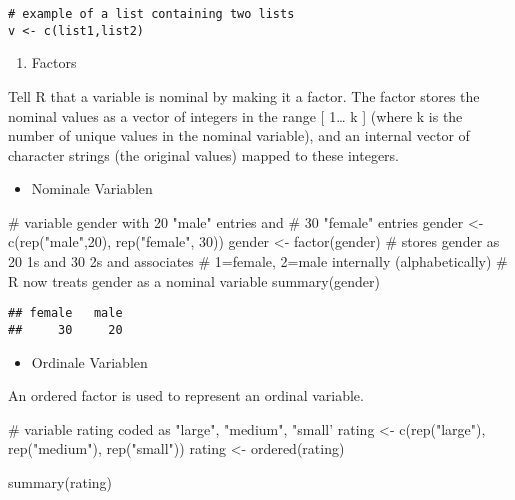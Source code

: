 \documentclass[]{article}
\newenvironment{Shaded}{\begin{snugshade}}{\end{snugshade}}
\newcommand{\KeywordTok}[1]{\textcolor[rgb]{0.94,0.87,0.69}{{#1}}}
\newcommand{\DecValTok}[1]{\textcolor[rgb]{0.86,0.86,0.80}{{#1}}}
\newcommand{\StringTok}[1]{\textcolor[rgb]{0.80,0.58,0.58}{{#1}}}
\newcommand{\CommentTok}[1]{\textcolor[rgb]{0.50,0.62,0.50}{{#1}}}
\newcommand{\NormalTok}[1]{\textcolor[rgb]{0.80,0.80,0.80}{{#1}}}
\begin{document}
\begin{verbatim}
# example of a list containing two lists 
v <- c(list1,list2)
\end{verbatim}

\begin{enumerate}
\def\labelenumi{\arabic{enumi}.}
\setcounter{enumi}{5}
\itemsep1pt\parskip0pt
\item
  Factors
\end{enumerate}

Tell R that a variable is nominal by making it a factor. The factor
stores the nominal values as a vector of integers in the range {[}
1\ldots{} k {]} (where k is the number of unique values in the nominal
variable), and an internal vector of character strings (the original
values) mapped to these integers.

\begin{itemize}
\itemsep1pt\parskip0pt
\item
  Nominale Variablen
\end{itemize}

\begin{Shaded}
\begin{Highlighting}[]
\CommentTok{# variable gender with 20 "male" entries and }
\CommentTok{# 30 "female" entries }
\NormalTok{gender <-}\StringTok{ }\KeywordTok{c}\NormalTok{(}\KeywordTok{rep}\NormalTok{(}\StringTok{"male"}\NormalTok{,}\DecValTok{20}\NormalTok{), }\KeywordTok{rep}\NormalTok{(}\StringTok{"female"}\NormalTok{, }\DecValTok{30}\NormalTok{)) }
\NormalTok{gender <-}\StringTok{ }\KeywordTok{factor}\NormalTok{(gender) }
\CommentTok{# stores gender as 20 1s and 30 2s and associates}
\CommentTok{# 1=female, 2=male internally (alphabetically)}
\CommentTok{# R now treats gender as a nominal variable }
\KeywordTok{summary}\NormalTok{(gender)}
\end{Highlighting}
\end{Shaded}

\begin{verbatim}
## female   male 
##     30     20
\end{verbatim}

\begin{itemize}
\itemsep1pt\parskip0pt
\item
  Ordinale Variablen
\end{itemize}

An ordered factor is used to represent an ordinal variable.

\begin{Shaded}
\begin{Highlighting}[]
\CommentTok{# variable rating coded as "large", "medium", "small'}
\NormalTok{rating <-}\StringTok{ }\KeywordTok{c}\NormalTok{(}\KeywordTok{rep}\NormalTok{(}\StringTok{"large"}\NormalTok{), }\KeywordTok{rep}\NormalTok{(}\StringTok{"medium"}\NormalTok{), }\KeywordTok{rep}\NormalTok{(}\StringTok{"small"}\NormalTok{))}
\NormalTok{rating <-}\StringTok{ }\KeywordTok{ordered}\NormalTok{(rating)}

\KeywordTok{summary}\NormalTok{(rating)}
\end{Highlighting}
\end{Shaded}
\end{document}
